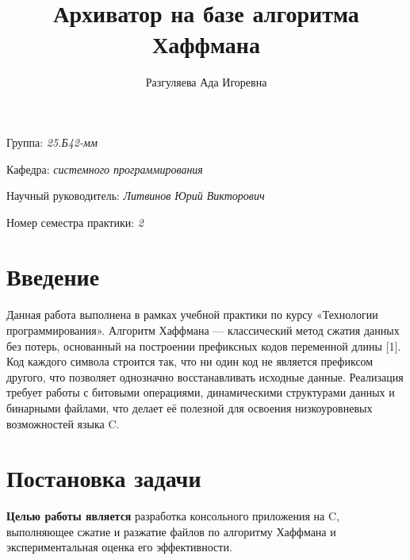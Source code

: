 \documentclass[a4paper]{article}
\title{Архиватор на базе алгоритма Хаффмана}
\author{Разгуляева Ада Игоревна}
\date{}
\begin{document}
\maketitle

\begin{flushright}
    Группа: \emph{25.Б42-мм}

    Кафедра: \emph{системного программирования}

    Научный руководитель: \emph{Литвинов Юрий Викторович}

    
    Номер семестра практики: \emph{2}
\end{flushright} 

\section{Введение}

Данная работа выполнена в рамках учебной практики по курсу «Технологии программирования». Алгоритм Хаффмана — классический метод сжатия данных без потерь, основанный на построении префиксных кодов переменной длины [1]. Код каждого символа строится так, что ни один код не является префиксом другого, что позволяет однозначно восстанавливать исходные данные. Реализация требует работы с битовыми операциями, динамическими структурами данных и бинарными файлами, что делает её полезной для освоения низкоуровневых возможностей языка C.


\section{Постановка задачи}

\textbf{Целью работы является} разработка консольного приложения на C, выполняющее сжатие и разжатие файлов по алгоритму Хаффмана и экспериментальная оценка его эффективности.
\end{document}
